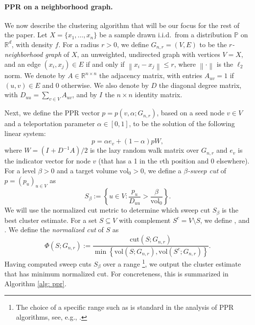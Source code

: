 \documentclass{article}
\newcommand{\set}[1]{\left\{#1\right\}}
\newcommand{\vol}{\mathrm{vol}}
\newcommand{\cut}{\mathrm{cut}}
\newcommand{\Reals}{\mathbb{R}}
\newcommand{\Rd}{\Reals^d}
\newcommand{\norm}[1]{\left\lVert#1\right\rVert}
\newcommand{\1}{\mathbf{1}}
\newcommand{\pbf}{p}        %
\newcommand{\ebf}[1]{{e}_{#1}}
\newcommand{\Abf}{A}
\newcommand{\Xbf}{X}             %
\newcommand{\Wbf}{W}
\newcommand{\Dbf}{D}
\newcommand{\Ibf}[1]{I_{#1}}
\newcommand{\Pbb}{\mathbb{P}}
\newcommand{\Cest}{\widehat{C}}
\theoremstyle{aldenthm}
\theoremstyle{aldenrmrk}
\begin{document}
\paragraph{PPR on a neighborhood graph.} We now describe the clustering
algorithm that will be our focus for the rest of the paper. Let $\Xbf = \{x_1,
\ldots, x_n\}$ be a sample drawn i.i.d.\ from a distribution $\Pbb$ on $\Rd$,
with density $f$.  For a radius $r > 0$, we define $G_{n,r}=(V,E)$ to be the
\emph{$r$-neighborhood graph} of $\Xbf$, an unweighted, undirected graph with
vertices $V=\Xbf$, and an edge $(x_i,x_j) \in E$ if and only if $\norm{x_i -
x_j} \leq r$, where $\norm{\cdot}$ is the $\ell_2$ norm. We denote by $\Abf \in
\Reals^{n \times n}$ the adjacency matrix, with entries $\Abf_{uv} = 1$ if
$(u,v) \in E$ and $0$ otherwise.  We also denote by $\Dbf$ the diagonal degree
matrix, with $\Dbf_{uu} = \sum_{v \in V} \Abf_{uv}$, and by $\Ibf{}$ the $n
\times n$ identity matrix.

Next, we define the PPR vector $\pbf = \pbf(v,\alpha;G_{n,r})$, based on
a seed node $v \in V$ and a teleportation parameter $\alpha \in [0,1]$, to be 
the solution of the following linear system:
\begin{equation}
\label{eqn: ppr_vector}
\pbf = \alpha \ebf{v} + (1 - \alpha) \pbf \Wbf,
\end{equation}
where $\Wbf = (\Ibf{} + \Dbf^{-1}\Abf)/2$ is the lazy random walk matrix over
$G_{n,r}$ and $e_{v}$ is the indicator vector for node $v$ (that has a 1 in the
$v$th position and 0 elsewhere). For a level $\beta > 0$ and a target volume
$\vol_0 > 0$, we define a \emph{$\beta$-sweep cut} of $\pbf = (p_u)_{u \in V}$
as   
\begin{equation}
\label{eqn: sweep_cuts}
S_\beta := \set{u \in V: \frac{p_u}{\Dbf_{uu}} > \frac{\beta}{\vol_{0}}}.
\end{equation}
We will use the normalized cut metric to determine which sweep cut $S_{\beta}$
is the best cluster estimate. For a set $S \subseteq V$ with complement $S^c = V
\setminus S$, we define \smash{$\cut(S;G_{n,r}) := \sum_{u \in S, v \in S^c}
\Abf_{uv}$}, and \smash{$\vol(S; G_{n,r}) := \sum_{u \in S} \Dbf_{uu}$}.  We
define the \emph{normalized cut} of $S$ as
\begin{equation}
\label{eqn: normalized_cut}
\Phi(S; G_{n,r}) := \frac{\cut(S;G_{n,r})}{\min \set{\vol(S; G_{n,r}), \vol(S^c; G_{n,r})}}.
\end{equation}
Having computed sweep cuts $S_{\beta}$ over a range \footnote{The choice of a specific range such as  
 is standard in the analysis of PPR
algorithms, see, e.g., \citep{zhu2013}.}, we output the cluster estimate
\smash{$\Cest = S_{\beta^*}$} that has minimum normalized cut.
For concreteness, this is summarized in Algorithm \ref{alg: ppr}. 
\end{document}
